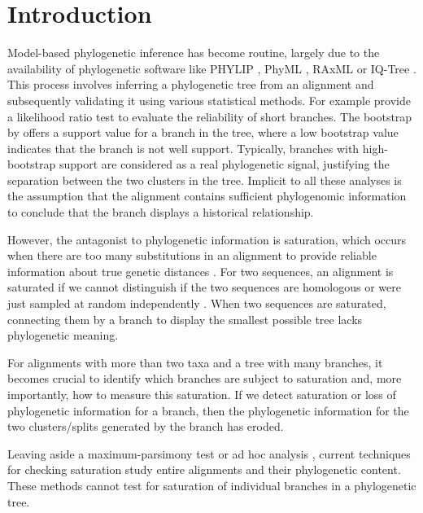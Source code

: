 \section*{Introduction}
Model-based phylogenetic inference has become routine, largely due to the availability of phylogenetic software like PHYLIP , PhyML , RAxML  or IQ-Tree . This process involves inferring a phylogenetic tree from an alignment and subsequently validating it using various statistical methods. For example  provide a likelihood ratio test to evaluate the reliability of short branches. The bootstrap by  offers a support value for a branch in the tree, where a low bootstrap value indicates that the branch is not well support. Typically, branches with high-bootstrap support are considered as a real phylogenetic signal, justifying the separation between the two clusters in the tree. Implicit to all these analyses is the assumption that the alignment contains sufficient phylogenomic information to conclude that the branch displays a historical relationship.

\medskip
However, the antagonist to phylogenetic information is saturation, which occurs when there are too many substitutions in an alignment to provide reliable information about true genetic distances . For two sequences, an alignment is saturated if we cannot distinguish if the two sequences are homologous or were just sampled at random independently  . When two sequences are saturated, connecting them by a branch to display the smallest possible tree lacks phylogenetic meaning. 

\medskip
For alignments with more than two taxa and a tree with many branches, it becomes crucial to identify which branches are subject to saturation and, more importantly, how to measure this saturation.  If we detect saturation or loss of phylogenetic information for a branch,  then the phylogenetic information for the two clusters/splits generated by the branch has eroded.

\medskip

Leaving aside a maximum-parsimony test  or ad hoc analysis , current techniques for checking saturation  study entire alignments and their phylogenetic content. These methods cannot test for saturation of individual branches in a phylogenetic tree.


